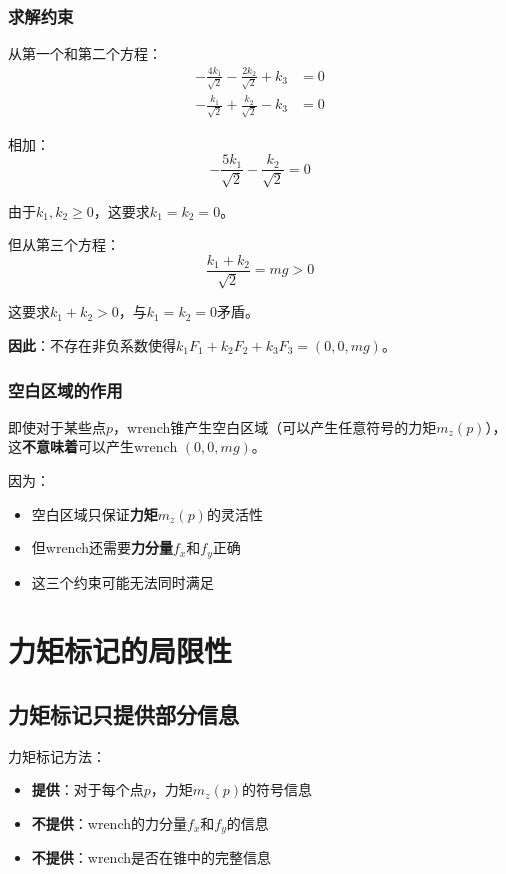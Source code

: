\documentclass[12pt,a4paper]{article}
\begin{document}
\subsubsection{求解约束}

从第一个和第二个方程：
\begin{align}
-\frac{4k_1}{\sqrt{2}} - \frac{2k_2}{\sqrt{2}} + k_3 &= 0 \\
-\frac{k_1}{\sqrt{2}} + \frac{k_2}{\sqrt{2}} - k_3 &= 0
\end{align}

相加：
\begin{equation}
-\frac{5k_1}{\sqrt{2}} - \frac{k_2}{\sqrt{2}} = 0
\end{equation}

由于$k_1, k_2 \geq 0$，这要求$k_1 = k_2 = 0$。

但从第三个方程：
\begin{equation}
\frac{k_1 + k_2}{\sqrt{2}} = mg > 0
\end{equation}

这要求$k_1 + k_2 > 0$，与$k_1 = k_2 = 0$矛盾。

\textbf{因此}：不存在非负系数使得$k_1 F_1 + k_2 F_2 + k_3 F_3 = (0, 0, mg)$。

\subsubsection{空白区域的作用}

即使对于某些点$p$，wrench锥产生空白区域（可以产生任意符号的力矩$m_z(p)$），这\textbf{不意味着}可以产生wrench $(0, 0, mg)$。

因为：
\begin{itemize}
    \item 空白区域只保证\textbf{力矩}$m_z(p)$的灵活性
    \item 但wrench还需要\textbf{力分量}$f_x$和$f_y$正确
    \item 这三个约束可能无法同时满足
\end{itemize}

\section{力矩标记的局限性}

\subsection{力矩标记只提供部分信息}

力矩标记方法：
\begin{itemize}
    \item \textbf{提供}：对于每个点$p$，力矩$m_z(p)$的符号信息
    \item \textbf{不提供}：wrench的力分量$f_x$和$f_y$的信息
    \item \textbf{不提供}：wrench是否在锥中的完整信息
\end{itemize}
\end{document}
